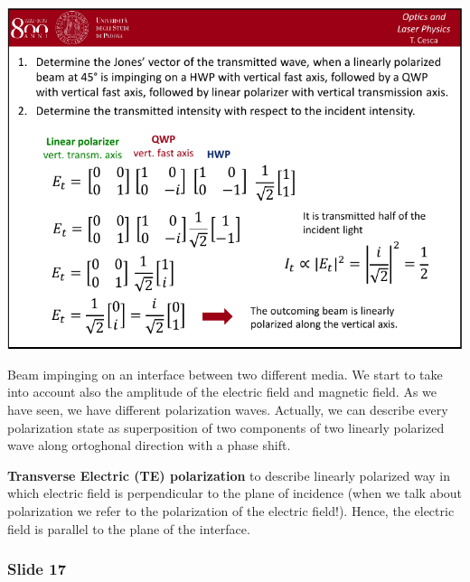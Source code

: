 \documentclass[../main/main.tex]{subfiles}
\begin{document}
\begin{minipage}[]{0.5\linewidth}
\centering
\includegraphics[page=16,width=1\textwidth]{../lessons/pdf_file/04_lecture.pdf}
\end{minipage}
\hspace{0.3cm}\vspace{0.3cm}
\begin{minipage}[c]{0.47\linewidth}

Beam impinging on an interface between two different media. We start to take into account also the amplitude of the electric field and magnetic field. As we have seen, we have different polarization waves. Actually, we can describe every polarization state as superposition of two components of two linearly polarized wave along ortoghonal direction with a phase shift.

\textbf{Transverse Electric (TE) polarization} to describe linearly polarized way in which electric field is perpendicular to the plane of incidence (when we talk about polarization we refer to the polarization of the electric field!). Hence, the electric field is parallel to the plane of the interface.


\end{minipage}

\subsubsection*{Slide 17}
\end{document}
